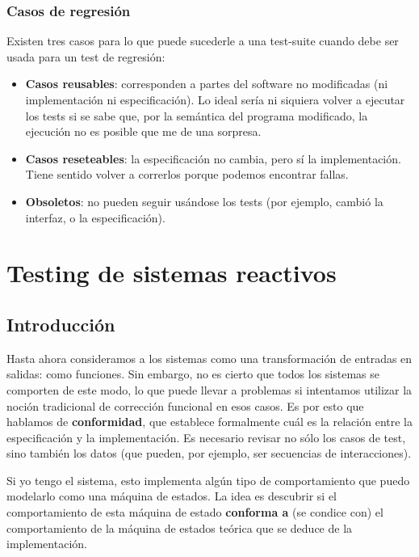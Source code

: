 \documentclass[]{article}
\begin{document}
\subsubsection{Casos de regresión}
Existen tres casos para lo que puede sucederle a una test-suite cuando debe ser usada para un test de regresión:
\begin{itemize}
	\item \textbf{Casos reusables}: corresponden a partes del software no modificadas (ni implementación ni especificación). Lo ideal sería ni siquiera volver a ejecutar los tests si se sabe que, por la semántica del programa modificado, la ejecución no es posible que me de una sorpresa.
	\item \textbf{Casos reseteables}: la especificación no cambia, pero sí la implementación. Tiene sentido volver a correrlos porque podemos encontrar fallas.
	\item \textbf{Obsoletos}: no pueden seguir usándose los tests (por ejemplo, cambió la interfaz, o la especificación).
\end{itemize}

%
%
%
%
%
%
%
%
%
%
%
%
%
%
%
%
%
%
%
%
%
%
%
%
%
%
%
%
%
%
\newpage

\section{Testing de sistemas reactivos}
\subsection{Introducción}
Hasta ahora consideramos a los sistemas como una transformación de entradas en salidas: como funciones. Sin embargo, no es cierto que todos los sistemas se comporten de este modo, lo que puede llevar a problemas si intentamos utilizar la noción tradicional de corrección funcional en esos casos. Es por esto que hablamos de \textbf{conformidad}, que establece formalmente cuál es la relación entre la especificación y la implementación. Es necesario revisar no sólo los casos de test, sino también los datos (que pueden, por ejemplo, ser secuencias de interacciones).

Si yo tengo el sistema, esto implementa algún tipo de comportamiento que puedo modelarlo como una máquina de estados. La idea es descubrir si el comportamiento de esta máquina de estado \textbf{conforma a} (se condice con) el comportamiento de la máquina de estados teórica que se deduce de la implementación.

\end{document}
